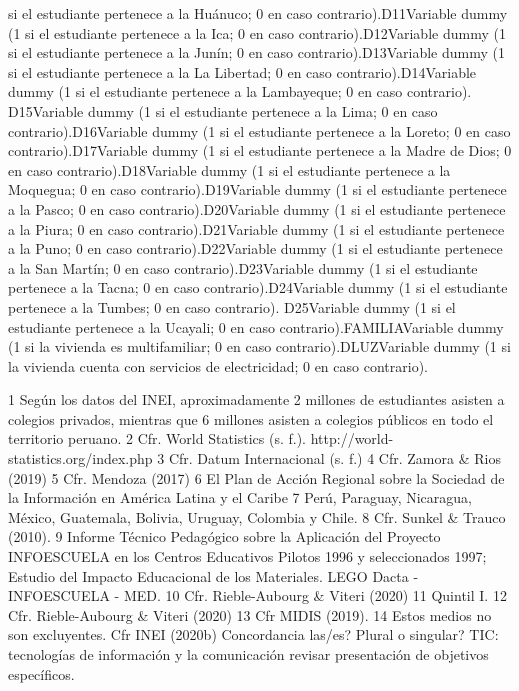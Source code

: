 \begin{enumerate}
  si el estudiante pertenece a la Huánuco; 0 en caso
  contrario).D11Variable dummy (1 si el estudiante pertenece a la Ica; 0
  en caso contrario).D12Variable dummy (1 si el estudiante pertenece a
  la Junín; 0 en caso contrario).D13Variable dummy (1 si el estudiante
  pertenece a la La Libertad; 0 en caso contrario).D14Variable dummy (1
  si el estudiante pertenece a la Lambayeque; 0 en caso contrario).
  D15Variable dummy (1 si el estudiante pertenece a la Lima; 0 en caso
  contrario).D16Variable dummy (1 si el estudiante pertenece a la
  Loreto; 0 en caso contrario).D17Variable dummy (1 si el estudiante
  pertenece a la Madre de Dios; 0 en caso contrario).D18Variable dummy
  (1 si el estudiante pertenece a la Moquegua; 0 en caso
  contrario).D19Variable dummy (1 si el estudiante pertenece a la Pasco;
  0 en caso contrario).D20Variable dummy (1 si el estudiante pertenece a
  la Piura; 0 en caso contrario).D21Variable dummy (1 si el estudiante
  pertenece a la Puno; 0 en caso contrario).D22Variable dummy (1 si el
  estudiante pertenece a la San Martín; 0 en caso contrario).D23Variable
  dummy (1 si el estudiante pertenece a la Tacna; 0 en caso
  contrario).D24Variable dummy (1 si el estudiante pertenece a la
  Tumbes; 0 en caso contrario). D25Variable dummy (1 si el estudiante
  pertenece a la Ucayali; 0 en caso contrario).FAMILIAVariable dummy (1
  si la vivienda es multifamiliar; 0 en caso contrario).DLUZVariable
  dummy (1 si la vivienda cuenta con servicios de electricidad; 0 en
  caso contrario).
\end{enumerate}

1 Según los datos del INEI, aproximadamente 2 millones de estudiantes
asisten a colegios privados, mientras que 6 millones asisten a colegios
públicos en todo el territorio peruano. 2 Cfr. World Statistics (s. f.).
http://world-statistics.org/index.php 3 Cfr. Datum Internacional (s. f.)
4 Cfr. Zamora \& Rios (2019) 5 Cfr. Mendoza (2017) 6 El Plan de Acción
Regional sobre la Sociedad de la Información en América Latina y el
Caribe 7 Perú, Paraguay, Nicaragua, México, Guatemala, Bolivia, Uruguay,
Colombia y Chile. 8 Cfr. Sunkel \& Trauco (2010). 9 Informe Técnico
Pedagógico sobre la Aplicación del Proyecto INFOESCUELA en los Centros
Educativos Pilotos 1996 y seleccionados 1997; Estudio del Impacto
Educacional de los Materiales. LEGO Dacta - INFOESCUELA - MED. 10 Cfr.
Rieble-Aubourg \& Viteri (2020) 11 Quintil I. 12 Cfr. Rieble-Aubourg \&
Viteri (2020) 13 Cfr MIDIS (2019). 14 Estos medios no son excluyentes.
Cfr INEI (2020b) Concordancia las/es? Plural o singular? TIC:
tecnologías de información y la comunicación revisar presentación de
objetivos específicos.

